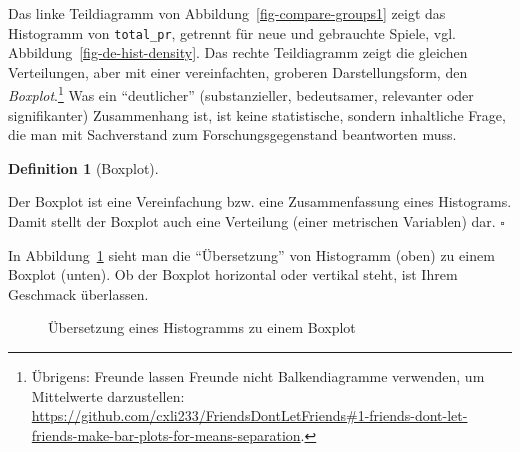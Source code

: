 \documentclass[
  letterpaper,
  twoside,
  open=any]{scrbook}
\theoremstyle{definition}
\theoremstyle{definition}
\theoremstyle{definition}
\newtheorem{definition}{Definition}[chapter]
\theoremstyle{remark}
\begin{document}
Das linke Teildiagramm von Abbildung~\ref{fig-compare-groups1} zeigt das
Histogramm von \texttt{total\_pr}, getrennt für neue und gebrauchte
Spiele, vgl. Abbildung~\ref{fig-de-hist-density}. Das rechte
Teildiagramm zeigt die gleichen Verteilungen, aber mit einer
vereinfachten, groberen Darstellungsform, den \emph{Boxplot}.\footnote{Übrigens:
  Freunde lassen Freunde nicht Balkendiagramme verwenden, um Mittelwerte
  darzustellen:
  \url{https://github.com/cxli233/FriendsDontLetFriends\#1-friends-dont-let-friends-make-bar-plots-for-means-separation}.}
Was ein \enquote{deutlicher} (substanzieller, bedeutsamer, relevanter
oder signifikanter) Zusammenhang ist, ist keine statistische, sondern
inhaltliche Frage, die man mit Sachverstand zum Forschungsgegenstand
beantworten muss.

\begin{definition}[Boxplot]\protect\hypertarget{def-boxplot}{}\label{def-boxplot}

Der Boxplot ist eine Vereinfachung bzw. eine Zusammenfassung eines
Histograms. Damit stellt der Boxplot auch eine Verteilung (einer
metrischen Variablen) dar. \(\square\)

\end{definition}

In Abbildung~\ref{fig-hist-to-box} sieht man die \enquote{Übersetzung}
von Histogramm (oben) zu einem Boxplot (unten). Ob der Boxplot
horizontal oder vertikal steht, ist Ihrem Geschmack überlassen.

\begin{figure}


\caption{\label{fig-hist-to-box}Übersetzung eines Histogramms zu einem
Boxplot}

\end{figure}%
\end{document}
